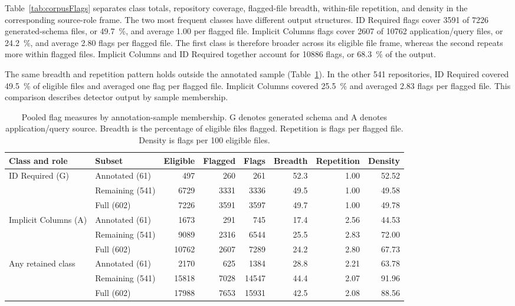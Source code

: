 Table~\ref{tab:corpusFlags} separates class totals, repository coverage, flagged-file breadth, within-file repetition, and density in the corresponding source-role frame. The two most frequent classes have different output structures. ID Required flags cover \num{3591} of \num{7226} generated-schema files, or \qty{49.7}{\percent}, and average \num{1.00} per flagged file. Implicit Columns flags cover \num{2607} of \num{10762} application/query files, or \qty{24.2}{\percent}, and average \num{2.80} flags per flagged file. The first class is therefore broader across its eligible file frame, whereas the second repeats more within flagged files. Implicit Columns and ID Required together account for \num{10886} flags, or \qty{68.3}{\percent} of the output.

The same breadth and repetition pattern holds outside the annotated sample (Table~\ref{tab:sampleSensitivity}). In the other \num{541} repositories, ID Required covered \qty{49.5}{\percent} of eligible files and averaged one flag per flagged file. Implicit Columns covered \qty{25.5}{\percent} and averaged \num{2.83} flags per flagged file. This comparison describes detector output by sample membership.

\begin{table}[H]
    \centering
    \scriptsize
    \setlength{\tabcolsep}{2pt}
    \caption{Pooled flag measures by annotation-sample membership. G denotes generated schema and A denotes application/query source. Breadth is the percentage of eligible files flagged. Repetition is flags per flagged file. Density is flags per 100 eligible files.}
    \label{tab:sampleSensitivity}
    \begin{tabular}{llrrrrrr}
        \hline
        Class and role & Subset & Eligible & Flagged & Flags & Breadth & Repetition & Density \\
        \hline
        ID Required (G) & Annotated (61) & 497 & 260 & 261 & 52.3 & 1.00 & 52.52 \\
        & Remaining (541) & 6729 & 3331 & 3336 & 49.5 & 1.00 & 49.58 \\
        & Full (602) & 7226 & 3591 & 3597 & 49.7 & 1.00 & 49.78 \\
        Implicit Columns (A) & Annotated (61) & 1673 & 291 & 745 & 17.4 & 2.56 & 44.53 \\
        & Remaining (541) & 9089 & 2316 & 6544 & 25.5 & 2.83 & 72.00 \\
        & Full (602) & 10762 & 2607 & 7289 & 24.2 & 2.80 & 67.73 \\
        Any retained class & Annotated (61) & 2170 & 625 & 1384 & 28.8 & 2.21 & 63.78 \\
        & Remaining (541) & 15818 & 7028 & 14547 & 44.4 & 2.07 & 91.96 \\
        & Full (602) & 17988 & 7653 & 15931 & 42.5 & 2.08 & 88.56 \\
        \hline
    \end{tabular}
\end{table}

